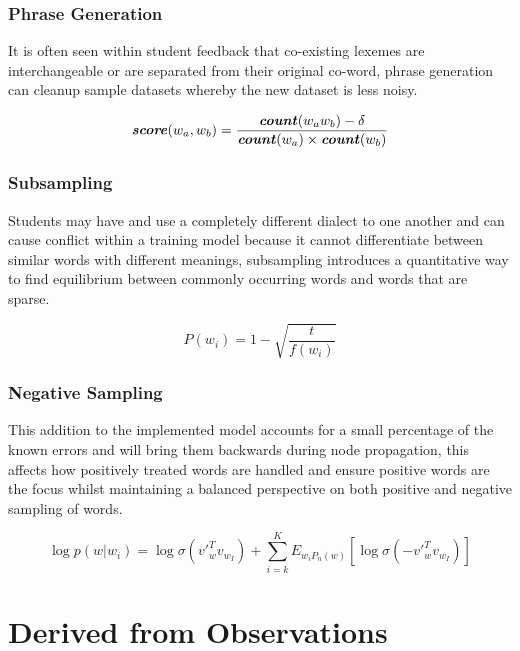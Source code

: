 \subsubsection{Phrase Generation}

It is often seen within student feedback that co-existing lexemes are interchangeable or are separated from their original co-word, phrase generation can cleanup sample datasets whereby the new dataset is less noisy.

\begin{equation}
    \textbf{\textit{score}}(w_{a}, w_{b}) = \frac{\textbf{\textit{count}}(w_{a}w_{b}) - \delta}{\textbf{\textit{count}}(w_{a}) \times \textbf{\textit{count}}(w_{b})}
\end{equation}

\subsubsection{Subsampling}

Students may have and use a completely different dialect to one another and can cause conflict within a training model because it cannot differentiate between similar words with different meanings, subsampling introduces a quantitative way to find equilibrium between commonly occurring words and words that are sparse.

\begin{equation}
    P(w_{i}) = 1 - \sqrt{\frac{t}{f(w_{i})}}
\end{equation}

\subsubsection{Negative Sampling}

This addition to the implemented model accounts for a small percentage of the known errors and will bring them backwards during node propagation, this affects how positively treated words are handled and ensure positive words are the focus whilst maintaining a balanced perspective on both positive and negative sampling of words.

\begin{equation}
    \log p(w | w_{i}) = \log \sigma ({v'}_{w}^{T} v_{w_{I}}) + \sum_{i=k}^{K} E_{w_{i}P_{n}(w)} \left [ \log \sigma (-{v'}_{w}^{T} v_{w_{I}}) \right ]
\end{equation}

\newpage

\section{Derived from Observations}

